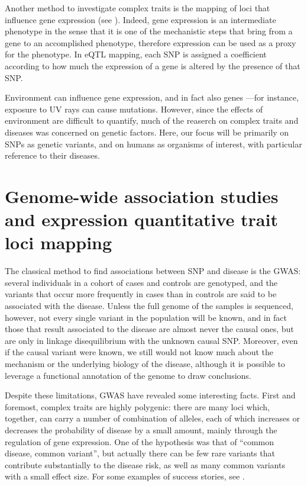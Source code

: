 \documentclass[../main.tex]{subfiles}
\begin{document}
Another method to investigate complex traits is the mapping of loci that 
influence gene expression (see ). Indeed, gene expression 
is an intermediate phenotype in the sense that it is one of the 
mechanistic steps that bring from a gene to an accomplished phenotype, 
therefore expression can be used as a proxy for the phenotype. In eQTL 
mapping, each SNP is assigned a coefficient according to how much the 
expression of a gene is altered by the presence of that SNP.

Environment can influence gene expression, and in fact also genes ---for 
instance, exposure to UV rays can cause mutations. However, since the 
effects of environment are difficult to quantify, much of the reaserch 
on complex traits and diseases was concerned on genetic factors. Here, 
our focus will be primarily on SNPs as genetic variants, and on humans 
as organisms of interest, with particular reference to their diseases.

\section{Genome-wide association studies and expression quantitative 
	trait loci mapping}


The classical method to find associations between SNP and disease is the 
GWAS: several individuals in a cohort of cases and controls are 
genotyped, and the variants that occur more frequently in cases than in 
controls are said to be associated with the disease. Unless the full 
genome of the samples is sequenced, however, not every single variant in 
the population will be known, and in fact those that result associated 
to the disease are almost never the causal ones, but are only in linkage 
disequilibrium with the unknown causal SNP\cite{Visscher2012}. Moreover, 
even if the causal variant were known, we still would not know much 
about the mechanism or the underlying biology of the disease, although 
it is possible to leverage a functional annotation of the genome to draw 
conclusions.

Despite these limitations, GWAS have revealed some interesting facts. 
First and foremost, complex traits are highly 
polygenic\cite{Visscher2017}: there are many loci which, together, can 
carry a number of combination of alleles, each of which increases or 
decreases the probability of disease by a small amount, mainly through 
the regulation of gene expression. One of the hypothesis was that of 
\enquote{common disease, common variant}, but actually there can be few 
rare variants that contribute substantially to the disease risk, as well 
as many common variants with a small effect size. For some examples of 
success stories, see .
\end{document}
